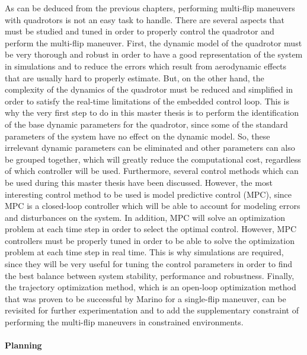 \documentclass{thesisreport}
\begin{document}
 



As can be deduced from the previous chapters, performing multi-flip maneuvers with quadrotors is not an easy task to handle. There are several aspects that must be studied and tuned in order to properly control the quadrotor and perform the multi-flip maneuver. 
First, the dynamic model of the quadrotor must be very thorough and robust in order to have a good representation of the system in simulations and to reduce the errors which result from aerodynamic effects that are usually hard to properly estimate. But, on the other hand, the complexity of the dynamics of the quadrotor must be reduced and simplified in order to satisfy the real-time limitations of the embedded control loop. This is why the very first step to do in this master thesis is to perform the identification of the base dynamic parameters for the quadrotor, since some of the standard parameters of the system have no effect on the dynamic model. So, these irrelevant dynamic parameters can be eliminated and other parameters can also be grouped together, which will greatly reduce the computational cost, regardless of which controller will be used.
Furthermore, several control methods which can be used during this master thesis have been discussed. However, the most interesting control method to be used is model predictive control (MPC), since MPC is a closed-loop controller which will be able to account for modeling errors and disturbances on the system. In addition, MPC will solve an optimization problem at each time step in order to select the optimal control. However, MPC controllers must be properly tuned in order to be able to solve the optimization problem at each time step in real time. This is why simulations are required, since they will be very useful for tuning the control parameters in order to find the best balance between system stability, performance and robustness.
Finally, the trajectory optimization method, which is an open-loop optimization method that was proven to be successful by Marino \cite{Marino2020} for a single-flip maneuver, can be revisited for further experimentation and to add the supplementary constraint of performing the multi-flip maneuvers in  constrained environments.




 
 \paragraph{Planning}
 
\end{document}
